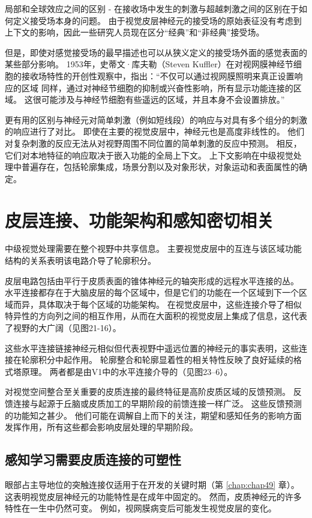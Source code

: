 局部和全球效应之间的区别 - 在接收场中发生的刺激与超越刺激之间的区别在于如何定义接受场本身的问题。 
由于视觉皮层神经元的接受场的原始表征没有考虑到上下文的影响，因此一些研究人员现在区分“经典”和“非经典”接受场。


但是，即使对感觉接受场的最早描述也可以从狭义定义的接受场外面的感觉表面的某些部分影响。 
1953年，史蒂文·库夫勒（Steven Kuffler）在对视网膜神经节细胞的接收场特性的开创性观察中，指出：“不仅可以通过视网膜照明来真正设置响应的区域 同样，通过对神经节细胞的抑制或兴奋性影响，所有显示功能连接的区域。 
这很可能涉及与神经节细胞有些遥远的区域，并且本身不会设置排放。”


更有用的区别与神经元对简单刺激（例如短线段）的响应与对具有多个组分的刺激的响应进行了对比。
即使在主要的视觉皮层中，神经元也是高度非线性的。 
他们对复杂刺激的反应无法从对视野周围不同位置的简单刺激的反应中预测。
相反，它们对本地特征的响应取决于嵌入功能的全局上下文。
上下文影响在中级视觉处理中普遍存在，包括轮廓集成，场景分割以及对象形状，对象运动和表面属性的确定。



\section{皮层连接、功能架构和感知密切相关}
中级视觉处理需要在整个视野中共享信息。
主要视觉皮层中的互连与该区域功能结构的关系表明该电路介导了轮廓积分。


皮层电路包括由平行于皮质表面的锥体神经元的轴突形成的远程水平连接的丛。
水平连接都存在于大脑皮层的每个区域中，但是它们的功能在一个区域到下一个区域而异，具体取决于每个区域的功能架构。
在视觉皮层中，这些连接介导了相似特异性的方向列之间的相互作用，从而在大面积的视觉皮层上集成了信息，这代表了视野的大广阔（见图21-16）。


这些水平连接链接神经元相似但代表视野中遥远位置的神经元的事实表明，这些连接在轮廓积分中起作用。
轮廓整合和轮廓显着性的相关特性反映了良好延续的格式塔原理。 两者都是由V1中的水平连接介导的（见图23–6）。


对视觉空间整合至关重要的皮质连接的最终特征是高阶皮质区域的反馈预测。
反馈连接与起源于丘脑或皮质加工的早期阶段的前馈连接一样广泛。
这些反馈预测的功能知之甚少。
他们可能在调解自上而下的关注，期望和感知任务的影响方面发挥作用，所有这些都会影响皮层处理的早期阶段。



\subsection{感知学习需要皮质连接的可塑性}
眼部占主导地位的突触连接仅适用于在开发的关键时期（第 \ref{chap:chap49} 章）。
这表明视觉皮层神经元的功能特性是在成年中固定的。 
然而，皮质神经元的许多特性在一生中仍然可变。
例如，视网膜病变后可能发生视觉皮层的变化。


